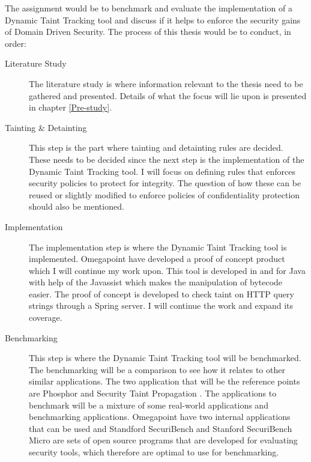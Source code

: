 \documentclass{../kththesis}
\begin{document}
	\noindent
	The assignment would be to benchmark and evaluate the implementation of a Dynamic Taint Tracking tool and discuss if it helps to enforce the security gains of Domain Driven Security. The process of this thesis would be to conduct, in order:
	
	\begin{description}  
		\item [Literature Study]
		The literature study is where information relevant to the thesis need to be gathered and presented. Details of what the focus will lie upon is presented in chapter \ref{Pre-study}.
	
		\item [Tainting \& Detainting]
		This step is the part where tainting and detainting rules are decided. These needs to be decided since the next step is the implementation of the Dynamic Taint Tracking tool. I will focus on defining rules that enforces security policies to protect for integrity. The question of how these can be reused or slightly modified to enforce policies of confidentiality protection should also be mentioned.
	
		\item [Implementation]
		The implementation step is where the Dynamic Taint Tracking tool is implemented. Omegapoint have developed a proof of concept product which I will continue my work upon. This tool is developed in and for Java with help of the Javassist \parencite{Javassist} which makes the manipulation of bytecode easier. The proof of concept is developed to check taint on HTTP query strings through a Spring server. I will continue the work and expand its coverage.
	
	
		\item [Benchmarking]
		This step is where the Dynamic Taint Tracking tool will be benchmarked. The benchmarking will be a comparison to see how it relates to other similar applications. The two application that will be the reference points are Phosphor \parencite{phosphor} and Security Taint Propagation \parencite{securityTaint}. The applications to benchmark will be a mixture of some real-world applications and benchmarking applications. Omegapoint have two internal applications that can be used and Standford SecuriBench \parencite{securiBench} and Stanford SecuriBench Micro \parencite{securiBenchMicro} are sets of open source programs that are developed for evaluating security tools, which therefore are optimal to use for benchmarking.
		

\end{description}
\end{document}
